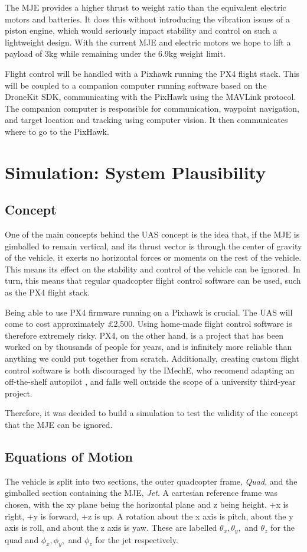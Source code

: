 \documentclass[11pt]{article}
\begin{document}
The MJE provides a higher thrust to weight ratio than the equivalent electric motors and batteries. It does this without introducing the vibration issues of a piston engine, which would seriously impact stability and control on such a lightweight design. With the current MJE and electric motors we hope to lift a payload of 3kg while remaining under the 6.9kg weight limit.

Flight control will be handled with a Pixhawk running the PX4 flight stack. This will be coupled to a companion computer running software based on the DroneKit SDK, communicating with the PixHawk using the MAVLink protocol. The companion computer is responsible for communication, waypoint navigation, and target location and tracking using computer vision. It then communicates where to go to the PixHawk.



\section{Simulation: System Plausibility}
\subsection{Concept}
One of the main concepts behind the UAS concept is the idea that, if the MJE is gimballed to remain vertical, and its thrust vector is through the center of gravity of the vehicle, it exerts no horizontal forces or moments on the rest of the vehicle. This means its effect on the stability and control of the vehicle can be ignored. In turn, this means that regular quadcopter flight control software can be used, such as the PX4 flight stack.

Being able to use PX4 firmware running on a Pixhawk is crucial. The UAS will come to cost approximately \pounds2,500. Using home-made flight control software is therefore extremely risky. PX4, on the other hand, is a project that has been worked on by thousands of people for years, and is infinitely more reliable than anything we could put together from scratch. Additionally, creating custom flight control software is both discouraged by the IMechE, who recomend adapting an off-the-shelf autopilot \cite{IMechE_rules}, and falls well outside the scope of a university third-year project.

Therefore, it was decided to build a simulation to test the validity of the concept that the MJE can be ignored.

\subsection{Equations of Motion}
The vehicle is split into two sections, the outer quadcopter frame, \emph{Quad}, and the gimballed section containing the MJE, \emph{Jet}. A cartesian reference frame was chosen, with the xy plane being the horizontal plane and z being height. +x is right, +y is forward, +z is up. A rotation about the x axis is pitch, about the y axis is roll, and about the z axis is yaw. These are labelled $\theta_x, \theta_y,$ and $\theta_z$ for the quad and $\phi_x, \phi_y,$ and $\phi_z$ for the jet respectively.
\end{document}
